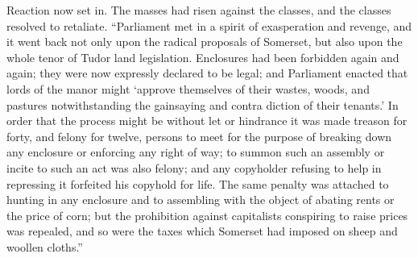 \documentclass{book}
\begin{document}
Reaction now set in. The masses had risen against the classes, and the classes resolved to retaliate. “Parliament met in a spirit of exasperation and revenge, and it went back not only upon the radical proposals of Somerset, but also upon the whole tenor of Tudor land legislation. Enclosures had been forbidden again and again; they were now expressly declared to be legal; and Parliament enacted that lords of the manor might ‘approve themselves of their wastes, woods, and pastures notwithstanding the gainsaying and contra diction of their tenants.’ In order that the process might be without let or hindrance it was made treason for forty, and felony for twelve, persons to meet for the purpose of breaking down any enclosure or enforcing any right of way; to summon such an assembly or incite to such an act was also felony; and any copyholder refusing to help in repressing it forfeited his copyhold for life. The same penalty was attached to hunting in any enclosure and to assembling with the object of abating rents or the price of corn; but the prohibition against capitalists conspiring to raise prices was repealed, and so were the taxes which Somerset had imposed on sheep and woollen cloths.”\footnotemark[3]
\end{document}
